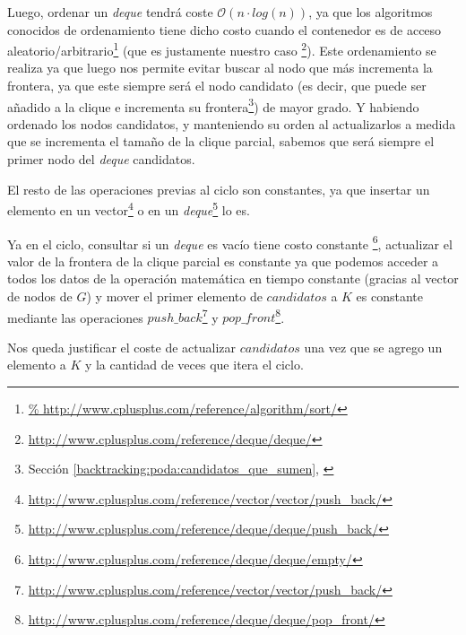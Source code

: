 \par Luego, ordenar un \emph{deque} tendr\'a coste $\mathcal O(n\cdot log(n))$, ya
    que los algoritmos conocidos de ordenamiento tiene dicho costo cuando el contenedor
    es de acceso aleatorio/arbitrario\footnote{\url{%
    http://www.cplusplus.com/reference/algorithm/sort/}} (que es justamente nuestro caso%
    \footnote{\url{http://www.cplusplus.com/reference/deque/deque/}}). Este ordenamiento
    se realiza ya que luego nos permite evitar buscar al nodo que m\'as incrementa
    la frontera, ya que este siempre ser\'a el nodo candidato (es decir, que
    puede ser a\~nadido a la clique e incrementa su frontera\footnote{Secci\'on
    \ref{backtracking:poda:candidatos_que_sumen}, \emph{}})
    de mayor grado. Y habiendo ordenado los nodos candidatos, y manteniendo
    su orden al actualizarlos a medida que se incrementa el tama\~no de la clique
    parcial, sabemos que ser\'a siempre el primer nodo del \emph{deque} candidatos.

\par El resto de las operaciones previas al ciclo son constantes, ya que insertar un 
    elemento en un vector\footnote{%
    \url{http://www.cplusplus.com/reference/vector/vector/push_back/}} o en un
    \emph{deque}\footnote{\url{http://www.cplusplus.com/reference/deque/deque/push_back/}}
    lo es.

\par Ya en el ciclo, consultar si un \emph{deque} es vac\'io tiene costo constante%
    \footnote{\url{http://www.cplusplus.com/reference/deque/deque/empty/}}, actualizar
    el valor de la frontera de la clique parcial es constante ya que podemos acceder
    a todos los datos de la operaci\'on matem\'atica en tiempo constante (gracias al
    vector de nodos de $G$) y mover el primer elemento de $candidatos$ a $K$ es constante
    mediante las operaciones
    $push\_back$\footnote{\url{http://www.cplusplus.com/reference/vector/vector/push_back/}}
    y $pop\_front$\footnote{\url{http://www.cplusplus.com/reference/deque/deque/pop_front/}}.

\par Nos queda justificar el coste de actualizar $candidatos$ una vez que se agrego
    un elemento a $K$ y la cantidad de veces que itera el ciclo.

